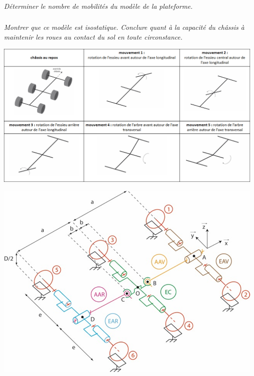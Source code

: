 \documentclass[10pt,fleqn]{article} %
\begin{document}
\begin{multicols}{2}
\subparagraph{}
\textit{Déterminer le nombre de mobilités du modèle de la plateforme.}
\ifprof
\begin{corrige}
\end{corrige}
\else
\fi

\subparagraph{}
\textit{Montrer que ce modèle est isostatique. Conclure quant à la capacité du châssis à maintenir les roues au contact du sol en toute circonstance.}
\ifprof
\begin{corrige}
\end{corrige}
\else
\fi


\ifprof
\else
\end{multicols}
\fi


\begin{center}
\includegraphics[width=\linewidth]{images/fig_11}
\end{center}

\begin{center}
\includegraphics[width=\linewidth]{images/fig_12}
\end{center}
\end{document}
